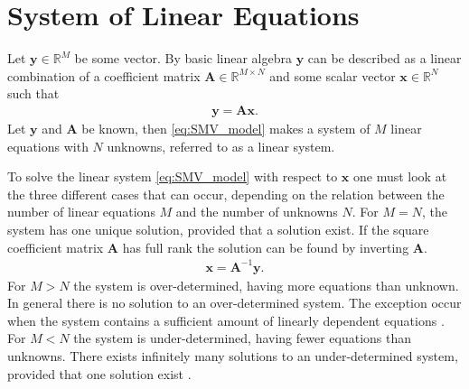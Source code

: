 \section{System of Linear Equations}\label{sec:SMV}
Let $\mathbf{y} \in \mathbb{R}^M$ be some vector. By basic linear algebra $\mathbf{y}$ can be described as a linear combination of a coefficient matrix $\mathbf{A} \in \mathbb{R}^{M \times N}$ and some scalar vector $\mathbf{x} \in \mathbb{R}^N$ such that
\begin{align}\label{eq:SMV_model}
\mathbf{y} = \mathbf{Ax}.
\end{align}
Let $\mathbf{y}$ and $\mathbf{A}$ be known, then  
\ref{eq:SMV_model} makes a system of $M$ linear equations with $N$ unknowns, referred to as a linear system. 

To solve the linear system \ref{eq:SMV_model} with respect to $\textbf{x}$ one must look at the three different cases that can occur, depending on the relation between the number of linear equations $M$ and the number of unknowns $N$.
For $M = N$, the system has one unique solution, provided that a solution exist.  
If the square coefficient matrix $\mathbf{A}$ has full rank the solution can be found by inverting $\mathbf{A}$.
\begin{align*}
\mathbf{x} = \mathbf{A}^{-1} \mathbf{y}.
\end{align*}
For $M > N$ the system is over-determined, having more equations than unknown. In general there is no solution to an over-determined system. The exception occur when the system contains a sufficient amount of linearly dependent equations .    
For $M < N$ the system is under-determined, having fewer equations than unknowns. There exists infinitely many solutions to an under-determined system, provided that one solution exist \cite[p. ix]{CS}.  

